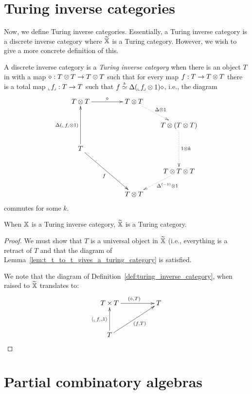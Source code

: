 \section{Turing inverse categories}
\label{sec:turing_inverse_categories}
Now, we define Turing inverse categories. Essentially, a Turing inverse category is a discrete
inverse category \X where $\widetilde{\mathbb{X}}$ is a Turing category. However, we wish to give a more concrete
definition of this.

\begin{definition}\label{def:turing_inverse_category}
  A discrete inverse category \X is a \emph{Turing inverse category} when there is an object $T$ in
  \X with a map $\diamond :T\otimes T \to T\otimes T$ such that for every map $f:T \to T\otimes T$ there is a total map
  ${}_\llcorner f_{\!\lrcorner}: T\to T$ such that $f \overset{\scriptscriptstyle k}{\simeq} \Delta({}_\llcorner f_{\!\lrcorner}\otimes1)\diamond$, i.e., the diagram
  \[
    \xymatrix @C=20pt @R=20pt{
      T\*T \ar[rr]^{\diamond} & & T \* T \ar@{.>}[dr]^{\Delta\* 1}\\
      & & & T \* (T\* T) \ar@{.>}[dd]^{1\*k}\\
      T \ar[uu]^{\Delta(\icode{f}\*1)} \ar[ddrr]_{f} \\
      & & & T \* T\*T \ar@{.>}[dl]^(.4){\inv{\Delta}\* 1}\\
      && T\*T
    }
  \]
  commutes for some $k$.
\end{definition}

\begin{lemma}\label{lem:turing_inverse_category_gives_a_turing_category}
  When $\mathbb{X}$ is a Turing inverse category, $\widetilde{\mathbb{X}}$ is a Turing category.
\end{lemma}
\begin{proof}
  We must show that $T$ is a universal object in $\widetilde{\mathbb{X}}$ (i.e., everything is a retract of $T$ and
  that the diagram of Lemma~\ref{lem:t_t_to_t_gives_a_turing_category} is satisfied.

  We note that the diagram of Definition~\ref{def:turing_inverse_category}, when raised to $\widetilde{\mathbb{X}}$
  translates to:
  \[
    \xymatrix@C+25pt@R+10pt{
      T \times T \ar[r]^{(\diamond, T)} &T \\
      T \ar[u]^{\<\icode{f},1\>} \ar[ur]_{(f, T)}
    }
  \]

\end{proof}

\section{Partial combinatory algebras}
\label{sec:partial_combinatory_algebras}

